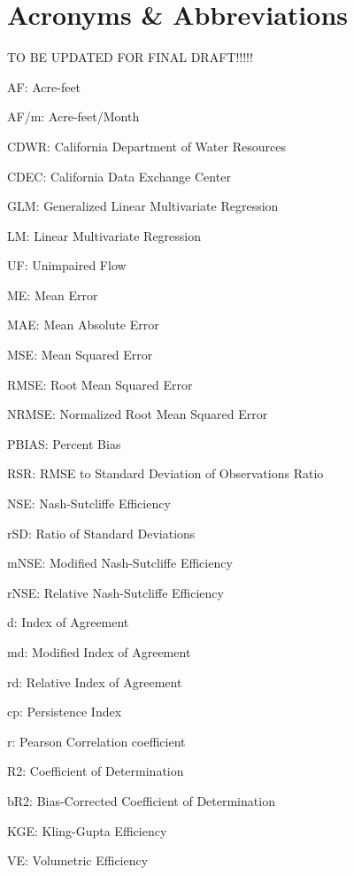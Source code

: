 \chapter*{Acronyms \& Abbreviations}
TO BE UPDATED FOR FINAL DRAFT!!!!!

AF: Acre-feet

AF/m: Acre-feet/Month

CDWR: California Department of Water Resources


CDEC: California Data Exchange Center

GLM: Generalized Linear Multivariate Regression

LM: Linear Multivariate Regression

UF: Unimpaired Flow

ME: Mean Error

MAE: Mean Absolute Error

MSE: Mean Squared Error

RMSE: Root Mean Squared Error

NRMSE: Normalized Root Mean Squared Error

PBIAS: Percent Bias

RSR: RMSE to Standard Deviation of Observations Ratio

NSE: Nash-Sutcliffe Efficiency

rSD: Ratio of Standard Deviations

mNSE: Modified Nash-Sutcliffe Efficiency

rNSE: Relative Nash-Sutcliffe Efficiency

d: Index of Agreement

md: Modified Index of Agreement

rd: Relative Index of Agreement

cp: Persistence Index

r: Pearson Correlation coefficient

R2: Coefficient of Determination

bR2: Bias-Corrected Coefficient of Determination

KGE: Kling-Gupta Efficiency

VE: Volumetric Efficiency










